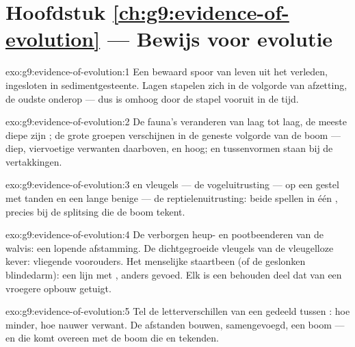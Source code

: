\section*{Hoofdstuk \ref{ch:g9:evidence-of-evolution} --- Bewijs voor evolutie}

\begin{solution}{exo:g9:evidence-of-evolution:1}
Een bewaard spoor van leven uit het verleden, ingesloten in
sedimentgesteente. Lagen stapelen zich in de volgorde van afzetting,
de oudste onderop --- dus is omhoog door de stapel vooruit in de tijd.
\end{solution}

\begin{solution}{exo:g9:evidence-of-evolution:2}
De fauna's veranderen van laag tot laag, de meeste diepe 
zijn ; de grote groepen verschijnen in de geneste
volgorde van de boom ---  diep, viervoetige verwanten
daarboven,  en  hoog; en tussenvormen staan bij de
vertakkingen.
\end{solution}

\begin{solution}{exo:g9:evidence-of-evolution:3}
 en vleugels --- de vogeluitrusting --- op een gestel met
tanden en een lange benige  --- de reptielenuitrusting: beide
spellen in één , precies bij de splitsing die de boom tekent.
\end{solution}

\begin{solution}{exo:g9:evidence-of-evolution:4}
De verborgen heup- en pootbeenderen van de walvis: een lopende
afstamming. De dichtgegroeide vleugels van de vleugelloze kever:
vliegende voorouders. Het menselijke staartbeen (of de geslonken
blindedarm): een lijn met , anders gevoed. Elk is een
behouden deel dat van een vroegere opbouw getuigt.
\end{solution}

\begin{solution}{exo:g9:evidence-of-evolution:5}
Tel de letterverschillen van een gedeeld  tussen : hoe
minder, hoe nauwer verwant. De afstanden bouwen, samengevoegd, een
boom --- en die komt overeen met de boom die  en 
tekenden.
\end{solution}

